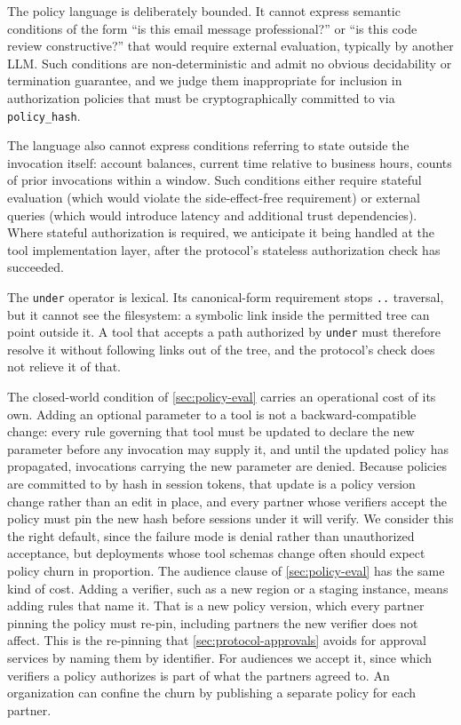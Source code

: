 \documentclass[11pt,a4paper]{article}
\begin{document}
The policy language is deliberately bounded. It cannot express
semantic conditions of the form ``is this email message
professional?'' or ``is this code review constructive?'' that would
require external evaluation, typically by another LLM. Such conditions
are non-deterministic and admit no obvious decidability or termination
guarantee, and we judge them inappropriate for inclusion in
authorization policies that must be cryptographically committed to via
\texttt{policy\_hash}.

The language also cannot express conditions referring to state outside
the invocation itself: account balances, current time relative to
business hours, counts of prior invocations within a window. Such
conditions either require stateful evaluation (which would violate the
side-effect-free requirement) or external queries (which would
introduce latency and additional trust dependencies). Where stateful
authorization is required, we anticipate it being handled at the tool
implementation layer, after the protocol's stateless authorization
check has succeeded.

The \texttt{under} operator is lexical. Its canonical-form requirement
stops \texttt{..} traversal, but it cannot see the filesystem: a
symbolic link inside the permitted tree can point outside it. A tool
that accepts a path authorized by \texttt{under} must therefore resolve
it without following links out of the tree, and the protocol's check
does not relieve it of that.

The closed-world condition of \cref{sec:policy-eval} carries an
operational cost of its own. Adding an optional parameter to a tool is
not a backward-compatible change: every rule governing that tool must be
updated to declare the new parameter before any invocation may supply
it, and until the updated policy has propagated, invocations carrying
the new parameter are denied. Because policies are committed to by hash
in session tokens, that update is a policy version change rather than an
edit in place, and every partner whose verifiers accept the policy
must pin the new hash before sessions under it will verify. We consider this the right default, since the
failure mode is denial rather than unauthorized acceptance, but
deployments whose tool schemas change often should expect policy churn
in proportion. The audience clause of \cref{sec:policy-eval} has the
same kind of cost. Adding a verifier, such as a new region or a staging
instance, means adding rules that name it. That is a new policy version,
which every partner pinning the policy must re-pin, including partners
the new verifier does not affect. This is the re-pinning that
\cref{sec:protocol-approvals} avoids for approval services by naming
them by identifier. For audiences we accept it, since which verifiers a
policy authorizes is part of what the partners agreed to. An
organization can confine the churn by publishing a separate policy for
each partner.
\end{document}
